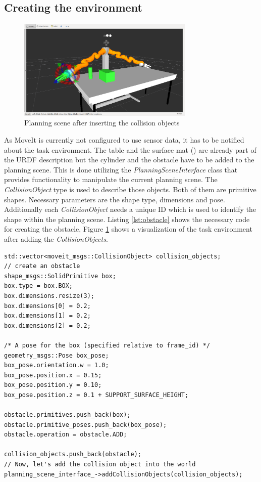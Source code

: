 \subsection{Creating the environment}
\begin{figure}[h]
	\centering
  	\includegraphics[width=0.75\textwidth]{images/task_env.png}
	\caption{Planning scene after inserting the collision objects}
	\label{fig:task_env}
\end{figure}
As MoveIt is currently not configured to use sensor data, it has to be notified about the task environment. The table and the surface mat () are already part of the URDF description but the cylinder and the obstacle have to be added to the planning scene. This is done utilizing the \emph{PlanningSceneInterface} class that provides functionality to manipulate the current planning scene. The \emph{CollisionObject} type is used to describe those objects. Both of them are primitive shapes. Necessary parameters are the shape type, dimensions and pose. Additionally each \emph{CollisionObject} needs a unique ID which is used to identify the shape within the planning scene. Listing \ref{lst:obstacle} shows the necessary code for creating the obstacle, Figure \ref{fig:task_env} shows a visualization of the task environment after adding the \emph{CollisionObjects}.

\lstset{style=customc}
\begin{minipage}{\linewidth}
\begin{lstlisting}[caption={Creating the obstacle}, label=lst:obstacle]
std::vector<moveit_msgs::CollisionObject> collision_objects;
// create an obstacle
shape_msgs::SolidPrimitive box;
box.type = box.BOX;
box.dimensions.resize(3);
box.dimensions[0] = 0.2;
box.dimensions[1] = 0.2;
box.dimensions[2] = 0.2;

/* A pose for the box (specified relative to frame_id) */
geometry_msgs::Pose box_pose;
box_pose.orientation.w = 1.0;
box_pose.position.x = 0.15;
box_pose.position.y = 0.10;
box_pose.position.z = 0.1 + SUPPORT_SURFACE_HEIGHT;

obstacle.primitives.push_back(box);
obstacle.primitive_poses.push_back(box_pose);
obstacle.operation = obstacle.ADD;

collision_objects.push_back(obstacle);
// Now, let's add the collision object into the world
planning_scene_interface_->addCollisionObjects(collision_objects);
\end{lstlisting}
\end{minipage}

